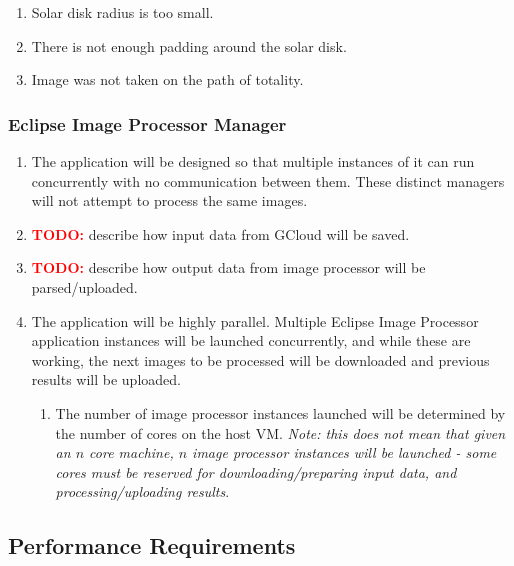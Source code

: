 \documentclass[10pt, onecolumn, draftclsnofoot, letterpaper, compsoc]{IEEEtran}
\begin{document}
\begin{enumerate}
\begin{enumerate}
			\item Solar disk radius is too small.

			\item There is not enough padding around the solar disk.

			\item Image was not taken on the path of totality.
		\end{enumerate}

	\end{enumerate}

\subsubsection{Eclipse Image Processor Manager}
	\begin{enumerate}
		\item The application will be designed so that multiple instances of it
		can run concurrently with no communication between them.
		These distinct managers will not attempt to process the same images.

		\item \textbf{\textcolor{red}{TODO:}} describe how input data from GCloud will be saved.

		\item \textbf{\textcolor{red}{TODO:}} describe how output data from image processor will be parsed/uploaded.
		
		\item The application will be highly parallel. Multiple Eclipse Image Processor
		application instances will be launched concurrently, and while these are working, 
		the next images to be processed will be downloaded and previous results will be 
		uploaded. 
		\begin{enumerate}
			\item The number of image processor instances launched will be determined by
			the number of cores on the host VM. \textit{Note: this does not mean that
			given an \(n\) core machine, \(n\) image processor instances will be launched - some cores
			must be reserved for downloading/preparing input data, and processing/uploading results}.
		\end{enumerate}		

	\end{enumerate}

\subsection{Performance Requirements}
\end{document}
